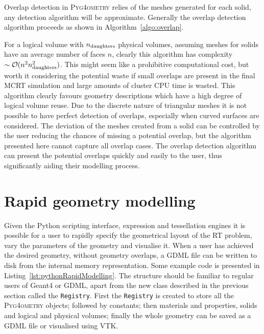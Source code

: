 \documentclass[final,5p,times,twocolumn]{elsarticle}
\newcommand{\pyinline}[1]{\lstinline[postbreak={}]{#1}}
\newcommand{\PYGEOMETRY}{\textsc{Pyg4ometry}}
\begin{document}
Overlap detection in \PYGEOMETRY{} relies of the meshes generated for each solid, 
any detection algorithm will be approximate. Generally the overlap detection 
algorithm proceeds as shown in Algorithm~\ref{algo:overlap}.

For a logical volume with $n_{\rm daughters}$ physical volumes, assuming meshes for solids have an average number of faces $n$, clearly this algorithm 
has complexity $\sim \mathcal{O}(n^2 n_{\rm daughters}^2)$. This might seem like a prohibitive computational cost, but worth it considering the potential 
waste if small overlaps are present in the final MCRT simulation and large amounts of cluster CPU time is wasted. This algorithm clearly favours geometry 
descriptions which have a high degree of logical volume reuse. Due to the discrete nature of triangular meshes it is not possible to have perfect detection 
of overlaps, especially when curved surfaces are considered. The deviation of the meshes created from a solid can be controlled by the user reducing the 
chances of missing a potential overlap, but the algorithm presented here cannot capture all overlap cases. The overlap detection algorithm can 
present the potential overlaps quickly and easily to the user, thus significantly aiding their modelling process. 

\section{Rapid geometry modelling}
Given the Python scripting interface, expression  and tessellation engines it is possible for a user to rapidly specify the geometrical layout of the RT problem, vary 
the parameters of the geometry and visualise it.  When a user has achieved the desired geometry, without geometry overlaps, a GDML file can be written to disk 
from the internal memory representation. Some example code is presented in Listing~\ref{lst:pythonRapidModelling}. The structure should be familiar to regular 
users of Geant4 or GDML, apart from the new class described in the previous section called the \pyinline{Registry}. First the \verb|Registry| is created to store all 
the \PYGEOMETRY{} objects; followed by constants;  then materials and properties, solids and logical and physical volumes; finally the whole geometry can be saved
as a GDML file or visualised using VTK.
\end{document}
